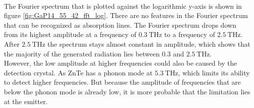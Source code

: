 \\
The Fourier spectrum that is plotted against the logarithmic y-axis is shown in figure \ref{fig:GaP14_55_42_fft_log}.
There are no features in the Fourier spectrum that can be recognized as absorption lines.
The Fourier spectrum drops down from its highest amplitude at a frequency of $\SI{0.3}{\tera\hertz}$ to a frequency of $\SI{2.5}{\tera\hertz}$.
After $\SI{2.5}{\tera\hertz}$ the spectrum stays almost constant in amplitude, which shows that the majority of the generated radiation lies between $0.3$ and $\SI{2.5}{\tera\hertz}$.
\\
However, the low amplitude at higher frequencies could also be caused by the detection crystal.
As ZnTe has a phonon mode at $\SI{5.3}{\tera\hertz}$, which limits its ability to detect higher frequencies.
But because the amplitude of frequencies that are below the phonon mode is already low, it is more probable that the limitation lies at the emitter.
